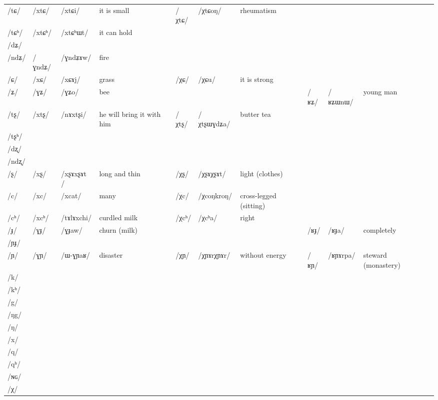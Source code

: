 \documentclass[oldfontcommands,oneside,a4paper,11pt]{article}
\newcommand{\ipa}[1]{/#1/} %
\newcommand{\tib}[1]{\cellcolor{lightgray}\textbf{#1}}
\newcommand{\idph}[1]{\cellcolor{gray}\textbf{#1}}
\begin{document}
\begin{table}
{\begin{tabular}{l|lll|lll|lll|l}
\ipa{tɕ}  & 	 \ipa{xtɕ}  & 	 \ipa{xtɕi}  & 	 it is small & 	 \ipa{χtɕ}  \tib{} & 	 \ipa{χtɕoŋ}  & 	rheumatism&&& \\  
\ipa{tɕʰ}  & 	 \ipa{xtɕʰ}  & 	 \ipa{xtɕʰɯt}  & 	it can hold  & 	  & 	  & 	&&& \\  
\ipa{dʑ}   & 	  & 	  & 	  & 	  & 	  & 	& 	  & 	  & 	 \\  
\ipa{ndʑ}  & 	 \ipa{ɣndʑ}  & 	 \ipa{ɣndʑɤw}  & 	fire  & 	  & 	  & &&&	 \\  
\ipa{ɕ}  & 	 \ipa{xɕ}  & 	 \ipa{xɕɤj}  & 	grass  & 	 \ipa{χɕ}  & 	 \ipa{χɕu}  & 	it is strong &&&\\  
\ipa{ʑ}  & 	 \ipa{ɣʑ}  & 	 \ipa{ɣʑo}  & 	bee  & 	&&& \ipa{ʁʑ}  &  	 \ipa{ʁʑɯnɯ}  & 	young man \\  
\ipa{tʂ}  & 	 \ipa{xtʂ}  & 	 \ipa{nɤxtʂi}  & 	 he will bring it with him & 	 \ipa{χtʂ}  \tib{}& 	 \ipa{χtʂɯɣdʑa}  & 	butter tea &&&\\  
\ipa{tʂʰ}  & 	  & 	  & 	  & 	  & 	  & &&&	 \\  
\ipa{dʐ}  & 	  & 	  & 	  & 	  & 	  & &&&	 \\  
\ipa{ndʐ}  & 	  & 	  & 	  & 	  & 	  & &&&	 \\  
\ipa{ʂ}  & 	 \ipa{xʂ} \idph{}  & 	 \ipa{xʂɤxʂɤt }  & 	long and thin  & 	 \ipa{χʂ} \idph{}  & 	 \ipa{χʂɤχʂɤt}  & 	light (clothes)&&& \\  
\ipa{c}  & 	 \ipa{xc}  & 	 \ipa{xcat}  & 	many  & 	 \ipa{χc} \tib{}  & 	 \ipa{χcoŋkroŋ}  & 	 cross-legged (sitting) &&&\\  
\ipa{cʰ}  & 	 \ipa{xcʰ}  & 	 \ipa{tɤlɤxchi}  & 	curdled milk  & 	 \ipa{χcʰ}  & 	 \ipa{χcʰa}  & 	 right &&&\\  
\ipa{ɟ}  & 	 \ipa{ɣɟ}  & 	 \ipa{ɣɟaw}  & 	 churn (milk) & &&&	 \ipa{ʁɟ}  & 	  \ipa{ʁɟa}  & 	completely  \\  
\ipa{ɲɟ}  & 	  & 	  & 	  & 	  & 	  & 	& 	  & 	  & 	 \\  
\ipa{ɲ}  & 	 \ipa{ɣɲ}  & 	 \ipa{ɯ-ɣɲaʁ}  & 	 disaster & 	\ipa{χɲ} \idph{}& \ipa{χɲɤrχɲɤr}& without energy & \ipa{ʁɲ}\tib{}  & 	 \ipa{ʁɲɤrpa}  & 	steward (monastery) \\  
\ipa{k}  & 	  & 	  & 	  & 	  & 	  & 	& 	  & 	  & 	 \\  
\ipa{kʰ}  & 	  & 	  & 	  & 	  & 	  & 	& 	  & 	  & 	 \\  
\ipa{g}   & 	  & 	  & 	  & 	  & 	  & 	& 	  & 	  & 	 \\  
\ipa{ŋg}   & 	  & 	  & 	  & 	  & 	  & 	& 	  & 	  & 	 \\  
\ipa{ŋ}  & 	  & 	  & 	  & 	  & 	  & 	& 	  & 	  & 	 \\  
\ipa{x}  & 	  & 	  & 	  & 	  & 	  & 	& 	  & 	  & 	 \\  
\ipa{q}   & 	  & 	  & 	  & 	  & 	  & 	& 	  & 	  & 	 \\  
\ipa{qʰ}   & 	  & 	  & 	  & 	  & 	  & 	& 	  & 	  & 	 \\  
\ipa{ɴɢ}   & 	  & 	  & 	  & 	  & 	  & 	& 	  & 	  & 	 \\  
\ipa{χ}   & 	  & 	  & 	  & 	  & 	  & 	& 	  & 	  & 	 \\  
\bottomrule
\end{tabular}}
\end{table}
\end{document}
